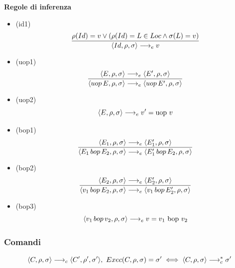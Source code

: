 \documentclass{article}
\begin{document}
\noindent\textbf{Regole di inferenza}
\begin{itemize}
    \item (id1)
          \[\frac
              {\rho(Id) = v \lor (\rho(Id) = L \in Loc \land \sigma(L) = v)}
              {\langle Id,\rho,\sigma \rangle \longrightarrow_e v}\]

    \item (uop1)
          \[\frac
              {\langle E,\rho,\sigma \rangle \longrightarrow_e \langle E',\rho,\sigma \rangle}
              {\langle uop\,E,\rho,\sigma \rangle \longrightarrow_e \langle uop\,E',\rho,\sigma \rangle}\]
    \item (uop2)
          \[\langle E,\rho,\sigma \rangle \longrightarrow_e v' = \text{uop } v\]

    \item (bop1)
          \[\frac
              {\langle E_1,\rho,\sigma \rangle \longrightarrow_e \langle E_1',\rho,\sigma \rangle}
              {\langle E_1 \,bop\, E_2,\rho,\sigma \rangle \longrightarrow_e \langle E_1'\,bop\,E_2,\rho,\sigma \rangle}\]
    \item (bop2)
          \[\frac
              {\langle E_2,\rho,\sigma \rangle \longrightarrow_e \langle E_2',\rho,\sigma \rangle}
              {\langle v_1\,bop\,E_2,\rho,\sigma \rangle \longrightarrow_e \langle v_1\,bop\,E_2',\rho,\sigma \rangle}\]
    \item (bop3)
          \[\langle v_1\,bop\,v_2,\rho,\sigma \rangle \longrightarrow_e v = v_1 \text{ bop } v_2\]

\end{itemize}

\subsubsection{Comandi}
\[\langle C,\rho,\sigma \rangle \longrightarrow_c \langle C',\rho',\sigma' \rangle,\ Exec(C,\rho,\sigma) = \sigma' \iff \langle C,\rho,\sigma \rangle \longrightarrow_c^* \sigma'\]
\end{document}
